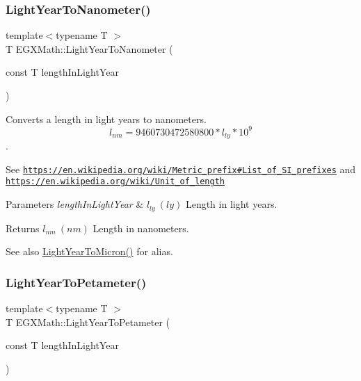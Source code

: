 \subsubsection{\texorpdfstring{Light\+Year\+To\+Nanometer()}{LightYearToNanometer()}}
{\footnotesize\ttfamily template$<$typename T $>$ \\
T E\+G\+X\+Math\+::\+Light\+Year\+To\+Nanometer (\begin{DoxyParamCaption}\item[{const T}]{length\+In\+Light\+Year }\end{DoxyParamCaption})}



Converts a length in light years to nanometers. \[ l_{nm}=9460730472580800 * l_{ly} * 10^{9} \]. 

See \href{https://en.wikipedia.org/wiki/Metric_prefix#List_of_SI_prefixes}{\tt https\+://en.\+wikipedia.\+org/wiki/\+Metric\+\_\+prefix\#\+List\+\_\+of\+\_\+\+S\+I\+\_\+prefixes} and \href{https://en.wikipedia.org/wiki/Unit_of_length}{\tt https\+://en.\+wikipedia.\+org/wiki/\+Unit\+\_\+of\+\_\+length} 
\begin{DoxyParams}{Parameters}
{\em length\+In\+Light\+Year} & $ l_{ly}\ (ly)$ Length in light years. \\
\hline
\end{DoxyParams}
\begin{DoxyReturn}{Returns}
$ l_{nm}\ (nm)$ Length in nanometers. 
\end{DoxyReturn}
\begin{DoxySeeAlso}{See also}
\mbox{\hyperlink{group___e_g_x_math-_conversions-_length_conversions-_astronomical-_light_year-_non-_s_i_gaa1be4e14f5ac7b272f28ce3e115b61c7}{Light\+Year\+To\+Micron()}} for alias. 
\end{DoxySeeAlso}
\mbox{\label{group___e_g_x_math-_conversions-_length_conversions-_astronomical-_light_year-_s_i_ga23dfd2716086a8359b2231a3fad972e6}} 
\subsubsection{\texorpdfstring{Light\+Year\+To\+Petameter()}{LightYearToPetameter()}}
{\footnotesize\ttfamily template$<$typename T $>$ \\
T E\+G\+X\+Math\+::\+Light\+Year\+To\+Petameter (\begin{DoxyParamCaption}\item[{const T}]{length\+In\+Light\+Year }\end{DoxyParamCaption})}



